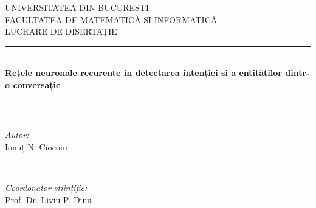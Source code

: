 \begin{titlepage}
	
	\newcommand{\HRule}{\rule{\linewidth}{0.5mm}} %
	
	\center %
	
	
	\textsc{\LARGE UNIVERSITATEA DIN BUCUREȘTI}\\[1.5cm] %
	\textsc{\Large FACULTATEA DE MATEMATICĂ ȘI INFORMATICĂ}\\[1.3cm] %
	\textsc{\large LUCRARE DE DISERTAȚIE}\\[0.3cm] %
	
	
	\HRule \\[0.7cm]
	{ \huge \bfseries Rețele neuronale recurente in detectarea intenției si a entităților dintr-o conversație}\\[0.4cm] %
	\HRule \\[1.5cm]
	
	
	\begin{minipage}{0.4\textwidth}
		\begin{flushleft} \large
			\emph{Autor:}\\
			Ionuț N. Ciocoiu %
		\end{flushleft}
	\end{minipage}
	~
	\begin{minipage}{0.4\textwidth}
		\begin{flushright} \large
			\emph{Coordonator științific:} \\
			Prof. Dr. Liviu P. Dinu %
		\end{flushright}
	\end{minipage}\\[4cm]
	

\end{titlepage}
